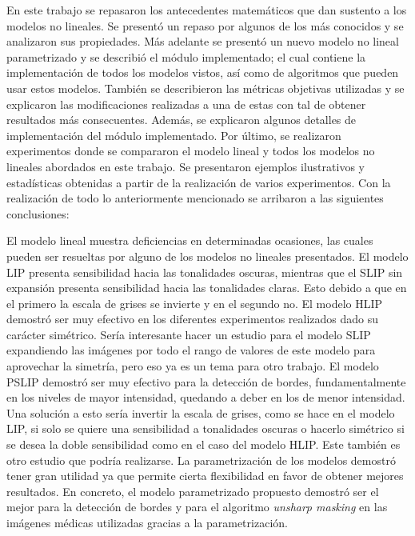 \begin{conclusions}
    En este trabajo se repasaron los antecedentes matem\'aticos que dan sustento a los modelos no lineales. Se present\'o un repaso por algunos de los m\'as conocidos y se analizaron sus propiedades. M\'as adelante se present\'o un nuevo modelo no lineal parametrizado y se describi\'o el m\'odulo implementado; el cual contiene la implementaci\'on de todos los modelos vistos, as\'i como de algoritmos que pueden usar estos modelos. Tambi\'en se describieron las m\'etricas objetivas utilizadas y se explicaron las modificaciones realizadas a una de estas con tal de obtener resultados m\'as consecuentes. Adem\'as, se explicaron algunos detalles de implementaci\'on del m\'odulo implementado. Por \'ultimo, se realizaron experimentos donde se compararon el modelo lineal y todos los modelos no lineales abordados en este trabajo. Se presentaron ejemplos ilustrativos y estad\'isticas obtenidas a partir de la realizaci\'on de varios experimentos. Con la realizaci\'on de todo lo anteriormente mencionado se arribaron a las siguientes conclusiones:
    
    El modelo lineal muestra deficiencias en determinadas ocasiones, las cuales pueden ser resueltas por alguno de los modelos no lineales presentados. El modelo LIP presenta sensibilidad hacia las tonalidades oscuras, mientras que el SLIP sin expansi\'on presenta sensibilidad hacia las tonalidades claras. Esto debido a que en el primero la escala de grises se invierte y en el segundo no. El modelo HLIP demostr\'o ser muy efectivo en los diferentes experimentos realizados dado su car\'acter sim\'etrico. Ser\'ia interesante hacer un estudio para el modelo SLIP expandiendo las im\'agenes por todo el rango de valores de este modelo para aprovechar la simetr\'ia, pero eso ya es un tema para otro trabajo. El modelo PSLIP demostr\'o ser muy efectivo para la detecci\'on de bordes, fundamentalmente en los niveles de mayor intensidad, quedando a deber en los de menor intensidad. Una soluci\'on a esto ser\'ia invertir la escala de grises, como se hace en el modelo LIP, si solo se quiere una sensibilidad a tonalidades oscuras o hacerlo sim\'etrico si se desea la doble sensibilidad como en el caso del modelo HLIP. Este tambi\'en es otro estudio que podr\'ia realizarse. La parametrizaci\'on de los modelos demostr\'o tener gran utilidad ya que permite cierta flexibilidad en favor de obtener mejores resultados. En concreto, el modelo parametrizado propuesto demostr\'o ser el mejor para la detecci\'on de bordes y para el algoritmo \textit{unsharp masking} en las im\'agenes m\'edicas utilizadas gracias a la parametrizaci\'on.
    

\end{conclusions}
